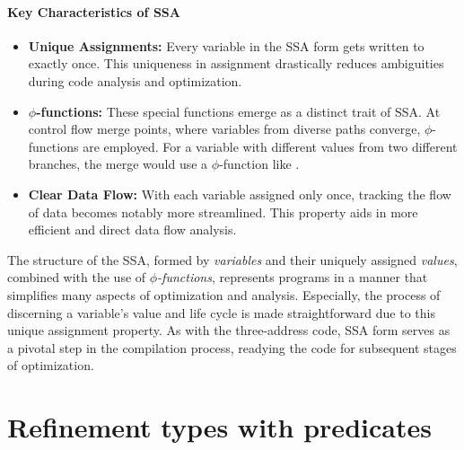 \documentclass[
  oneside,
  english,
  coorientadorbanca,
  noabntexcite
]{ufsc-thesis-rn46-2019}
\newcommand{\code}[1]{\text{\scpfamily\setlength\spaceskip{0.35em}#1}}
\begin{document}
\subsubsection{Key Characteristics of SSA}

\begin{itemize}
    \item \textbf{Unique Assignments:} Every variable in the SSA form gets written to exactly once. This uniqueness in assignment drastically reduces ambiguities during code analysis and optimization.

    \item \textbf{$\phi$-functions:} These special functions emerge as a distinct trait of SSA. At control flow merge points, where variables from diverse paths converge, $\phi$-functions are employed. For a variable \code{x} with different values from two different branches, the merge would use a $\phi$-function like \code{x3 = φ(x1, x2)}.

    \item \textbf{Clear Data Flow:} With each variable assigned only once, tracking the flow of data becomes notably more streamlined. This property aids in more efficient and direct data flow analysis.
\end{itemize}

The structure of the SSA, formed by \textit{variables} and their uniquely assigned \textit{values}, combined with the use of \textit{$\phi$-functions}, represents programs in a manner that simplifies many aspects of optimization and analysis. Especially, the process of discerning a variable's value and life cycle is made straightforward due to this unique assignment property. As with the three-address code, SSA form serves as a pivotal step in the compilation process, readying the code for subsequent stages of optimization.



\chapter{Refinement types with predicates}\label{ch:refinement_types}
\end{document}
